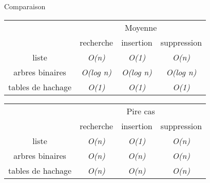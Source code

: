 \documentclass{beamer}
\begin{document}
  \begin{frame}{Comparaison}
    \begin{table}[]
\centering
\begin{tabular}{cccc}
\multicolumn{1}{l}{}                   & \multicolumn{3}{c}{Moyenne}                                                                     \\
\multicolumn{1}{l|}{}                  & \multicolumn{1}{l}{recherche} & \multicolumn{1}{l}{insertion} & \multicolumn{1}{l}{suppression} \\ \hline
\multicolumn{1}{c|}{liste}             & \textit{O(n)}                 & \textit{O(1)}                 & \textit{O(n)}                   \\
\multicolumn{1}{c|}{arbres binaires}   & \textit{O(log n)}             & \textit{O(log n)}             & \textit{O(log n)}               \\
\multicolumn{1}{c|}{tables de hachage} & \textit{O(1)}                 & \textit{O(1)}                 & \textit{O(1)}
\end{tabular}
\end{table}

\begin{table}[]
\centering
\begin{tabular}{cccc}
\multicolumn{1}{l}{}                   & \multicolumn{3}{c}{Pire cas}                                                                    \\
\multicolumn{1}{l|}{}                  & \multicolumn{1}{l}{recherche} & \multicolumn{1}{l}{insertion} & \multicolumn{1}{l}{suppression} \\ \hline
\multicolumn{1}{c|}{liste}             & \textit{O(n)}                 & \textit{O(1)}                 & \textit{O(n)}                   \\
\multicolumn{1}{c|}{arbres binaires}   & \textit{O(n)}                 & \textit{O(n)}                 & \textit{O(n)}                   \\
\multicolumn{1}{c|}{tables de hachage} & \textit{O(n)}                 & \textit{O(n)}                 & \textit{O(n)}
\end{tabular}
\end{table}
  \end{frame}
\end{document}
